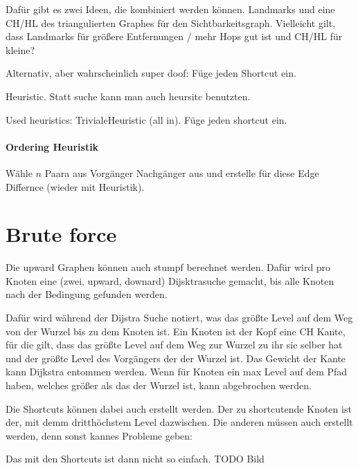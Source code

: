 Dafür gibt es zwei Ideen, die kombiniert werden können.
Landmarks und eine CH/HL des triangulierten Graphes für den Sichtbarkeitsgraph.
Vielleicht gilt, dass Landmarks für größere Entfernungen / mehr Hops gut ist und CH/HL für kleine?

Alternativ, aber wahrscheinlich super doof:
Füge jeden Shortcut ein.

Heuristic.
Statt suche kann man auch heursitc benutzten.

Used heuristics:
TrivialeHeuristic (all in). Füge jeden shortcut ein.

\paragraph{Ordering Heuristik}
Wähle $n$ Paara aus Vorgänger Nachgänger aus und erstelle für diese Edge Differnce (wieder mit Heuristik).

\section{Brute force}

Die upward Graphen können auch stumpf berechnet werden.
Dafür wird pro Knoten eine (zwei, upward, downard) Dijsktrasuche gemacht, bis alle Knoten nach der Bedingung gefunden werden.


Dafür wird während der Dijstra Suche notiert, was das größte Level auf dem Weg von der Wurzel bis zu dem Knoten ist.
Ein Knoten ist der Kopf eine CH Kante, für die gilt, dass das größte Level auf dem Weg zur Wurzel zu ihr sie selber hat und der größte Level des Vorgängers der der Wurzel ist.
Das Gewicht der Kante kann Dijkstra entommen werden.
Wenn für Knoten ein max Level auf dem Pfad haben, welches größer als das der Wurzel ist, kann abgebrochen werden.

Die Shortcuts können dabei auch erstellt werden.
Der zu shortcutende Knoten ist der, mit demm dritthöchstem Level dazwischen.
Die anderen müssen auch erstellt werden, denn sonst kannes Probleme geben: 

Das mit den Shortcuts ist dann nicht so einfach. TODO Bild

